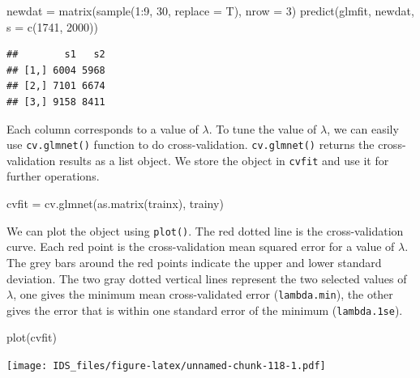 \documentclass[
  12pt,
]{krantz}
\makeatletter
\newenvironment{Shaded}{\begin{snugshade}}{\end{snugshade}}
\newcommand{\AttributeTok}[1]{\textcolor[rgb]{0.61,0.61,0.61}{#1}}
\newcommand{\DecValTok}[1]{\textcolor[rgb]{0.06,0.06,0.06}{#1}}
\newcommand{\FunctionTok}[1]{\textcolor[rgb]{0,0,0}{#1}}
\newcommand{\NormalTok}[1]{#1}
\newcommand{\OtherTok}[1]{\textcolor[rgb]{0.37,0.37,0.37}{#1}}
\newcommand{\SpecialCharTok}[1]{\textcolor[rgb]{0,0,0}{#1}}
\newenvironment{kframe}{%
\medskip{}
\setlength{\fboxsep}{.8em}
 \def\at@end@of@kframe{}%
 \ifinner\ifhmode%
  \def\at@end@of@kframe{\end{minipage}}%
  \begin{minipage}{\columnwidth}%
 \fi\fi%
 \def\FrameCommand##1{\hskip\@totalleftmargin \hskip-\fboxsep
 \colorbox{shadecolor}{##1}\hskip-\fboxsep
     \hskip-\linewidth \hskip-\@totalleftmargin \hskip\columnwidth}%
 \MakeFramed {\advance\hsize-\width
   \@totalleftmargin\z@ \linewidth\hsize
   \@setminipage}}%
 {\par\unskip\endMakeFramed%
 \at@end@of@kframe}
\renewenvironment{Shaded}{\begin{kframe}}{\end{kframe}}
\makeatother
\begin{document}
\begin{Shaded}
\begin{Highlighting}[]
\NormalTok{newdat }\OtherTok{=} \FunctionTok{matrix}\NormalTok{(}\FunctionTok{sample}\NormalTok{(}\DecValTok{1}\SpecialCharTok{:}\DecValTok{9}\NormalTok{, }\DecValTok{30}\NormalTok{, }\AttributeTok{replace =}\NormalTok{ T), }\AttributeTok{nrow =} \DecValTok{3}\NormalTok{)}
\FunctionTok{predict}\NormalTok{(glmfit, newdat, }\AttributeTok{s =} \FunctionTok{c}\NormalTok{(}\DecValTok{1741}\NormalTok{, }\DecValTok{2000}\NormalTok{))}
\end{Highlighting}
\end{Shaded}

\begin{verbatim}
##        s1   s2
## [1,] 6004 5968
## [2,] 7101 6674
## [3,] 9158 8411
\end{verbatim}

Each column corresponds to a value of \(\lambda\). To tune the value of \(\lambda\), we can easily use \texttt{cv.glmnet()} function to do cross-validation. \texttt{cv.glmnet()} returns the cross-validation results as a list object. We store the object in \texttt{cvfit} and use it for further operations.

\begin{Shaded}
\begin{Highlighting}[]
\NormalTok{cvfit }\OtherTok{=} \FunctionTok{cv.glmnet}\NormalTok{(}\FunctionTok{as.matrix}\NormalTok{(trainx), trainy)}
\end{Highlighting}
\end{Shaded}

We can plot the object using \texttt{plot()}. The red dotted line is the cross-validation curve. Each red point is the cross-validation mean squared error for a value of \(\lambda\). The grey bars around the red points indicate the upper and lower standard deviation. The two gray dotted vertical lines represent the two selected values of \(\lambda\), one gives the minimum mean cross-validated error (\texttt{lambda.min}), the other gives the error that is within one standard error of the minimum (\texttt{lambda.1se}).

\begin{Shaded}
\begin{Highlighting}[]
\FunctionTok{plot}\NormalTok{(cvfit)}
\end{Highlighting}
\end{Shaded}

\texttt{[image: IDS\_files/figure-latex/unnamed-chunk-118-1.pdf]}
\end{document}
